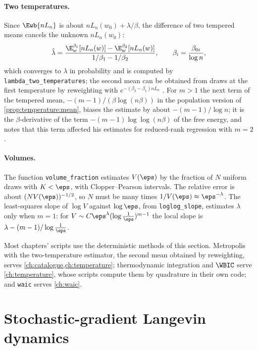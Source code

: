 \begin{refsection}
\paragraph{Two temperatures.} Since $\Ewb{nL_n}$ is about $nL_n(w_0)+\lambda/\beta$, the difference of two tempered means cancels the unknown $nL_n(w_0)$:
\[
\hat\lambda=\frac{\E^{\beta_1}_w[nL_n(w)]-\E^{\beta_2}_w[nL_n(w)]}{1/\beta_1-1/\beta_2},\qquad\beta_i=\frac{\beta_{0i}}{\log n},
\]
which converges to $\lambda$ in probability \parencite[Corollary~3]{Watanabe2013} and is computed by \texttt{lambda\_\allowbreak two\_\allowbreak temperatures}; the second mean can be obtained from draws at the first temperature by reweighting with $e^{-(\beta_2-\beta_1)nL_n}$ \parencite[eq.~(20)]{Watanabe2013}. For $m>1$ the next term of the tempered mean, $-(m-1)/(\beta\log(n\beta))$ in the population version of \cref{prop:temperature:mean}, biases the estimate by about $-(m-1)/\log n$; it is the $\beta$-derivative of the term $-(m-1)\log\log(n\beta)$ of the free energy, and \textcite{Watanabe2013} notes that this term affected his estimates for reduced-rank regression with $m=2$.

\paragraph{Volumes.} The function \texttt{volume\_\allowbreak fraction} estimates $V(\eps)$ by the fraction of $N$ uniform draws with $K<\eps$, with Clopper--Pearson intervals. The relative error is about $(NV(\eps))^{-1/2}$, so $N$ must be many times $1/V(\eps)\approx\eps^{-\lambda}$. The least-squares slope of $\log V$ against $\log\eps$, from \texttt{loglog\_\allowbreak slope}, estimates $\lambda$ only when $m=1$: for $V\sim C\eps^\lambda(\log\frac1\eps)^{m-1}$ the local slope is $\lambda-(m-1)/\log\frac1\eps$.

Most chapters' scripts use the deterministic methods of this section. Metropolis with the two-temperature estimator, the second mean obtained by reweighting, serves \cref{ch:catalogue,ch:temperature}; thermodynamic integration and $\WBIC$ serve \cref{ch:temperature}, whose scripts compute them by quadrature in their own code; and \texttt{waic} serves \cref{ch:waic}.

\section{Stochastic-gradient Langevin dynamics}\label{sec:toolkit:sgld}


\end{refsection}
